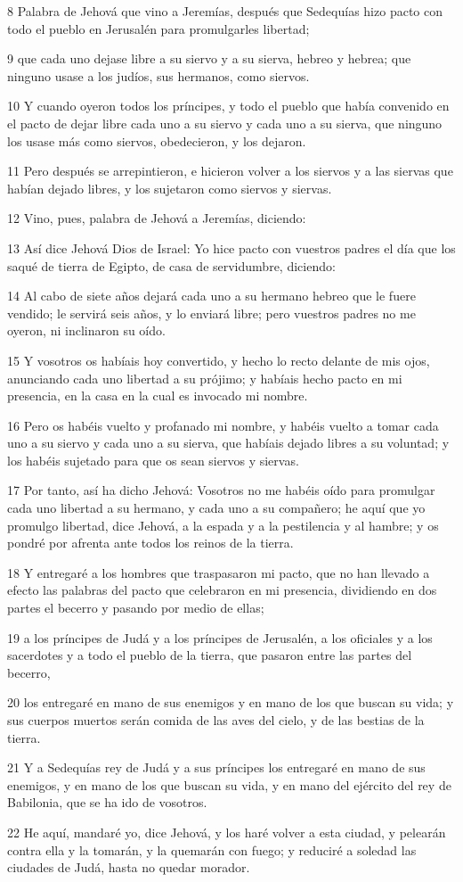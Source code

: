 \par 8 Palabra de Jehová que vino a Jeremías, después que Sedequías hizo pacto con todo el pueblo en Jerusalén para promulgarles libertad;
\par 9 que cada uno dejase libre a su siervo y a su sierva, hebreo y hebrea; que ninguno usase a los judíos, sus hermanos, como siervos.
\par 10 Y cuando oyeron todos los príncipes, y todo el pueblo que había convenido en el pacto de dejar libre cada uno a su siervo y cada uno a su sierva, que ninguno los usase más como siervos, obedecieron, y los dejaron.
\par 11 Pero después se arrepintieron, e hicieron volver a los siervos y a las siervas que habían dejado libres, y los sujetaron como siervos y siervas.
\par 12 Vino, pues, palabra de Jehová a Jeremías, diciendo:
\par 13 Así dice Jehová Dios de Israel: Yo hice pacto con vuestros padres el día que los saqué de tierra de Egipto, de casa de servidumbre, diciendo:
\par 14 Al cabo de siete años dejará cada uno a su hermano hebreo que le fuere vendido; le servirá seis años, y lo enviará libre; pero vuestros padres no me oyeron, ni inclinaron su oído.
\par 15 Y vosotros os habíais hoy convertido, y hecho lo recto delante de mis ojos, anunciando cada uno libertad a su prójimo; y habíais hecho pacto en mi presencia, en la casa en la cual es invocado mi nombre.
\par 16 Pero os habéis vuelto y profanado mi nombre, y habéis vuelto a tomar cada uno a su siervo y cada uno a su sierva, que habíais dejado libres a su voluntad; y los habéis sujetado para que os sean siervos y siervas.
\par 17 Por tanto, así ha dicho Jehová: Vosotros no me habéis oído para promulgar cada uno libertad a su hermano, y cada uno a su compañero; he aquí que yo promulgo libertad, dice Jehová, a la espada y a la pestilencia y al hambre; y os pondré por afrenta ante todos los reinos de la tierra.
\par 18 Y entregaré a los hombres que traspasaron mi pacto, que no han llevado a efecto las palabras del pacto que celebraron en mi presencia, dividiendo en dos partes el becerro y pasando por medio de ellas;
\par 19 a los príncipes de Judá y a los príncipes de Jerusalén, a los oficiales y a los sacerdotes y a todo el pueblo de la tierra, que pasaron entre las partes del becerro,
\par 20 los entregaré en mano de sus enemigos y en mano de los que buscan su vida; y sus cuerpos muertos serán comida de las aves del cielo, y de las bestias de la tierra.
\par 21 Y a Sedequías rey de Judá y a sus príncipes los entregaré en mano de sus enemigos, y en mano de los que buscan su vida, y en mano del ejército del rey de Babilonia, que se ha ido de vosotros.
\par 22 He aquí, mandaré yo, dice Jehová, y los haré volver a esta ciudad, y pelearán contra ella y la tomarán, y la quemarán con fuego; y reduciré a soledad las ciudades de Judá, hasta no quedar morador.


